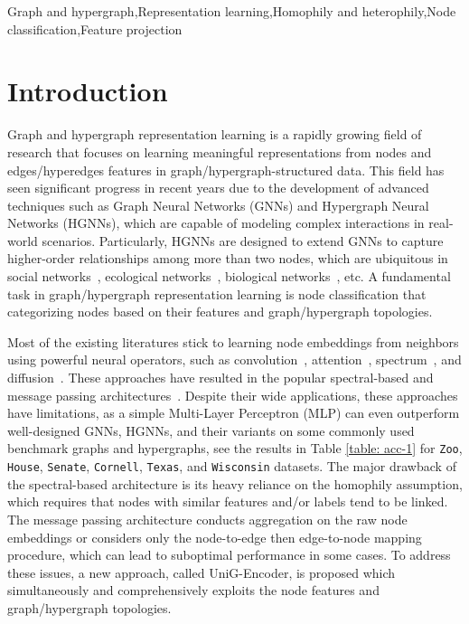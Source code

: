 \documentclass[review]{elsarticle}
\begin{document}
\begin{frontmatter}
\begin{keyword}
Graph and hypergraph\sep Representation learning\sep Homophily and heterophily\sep Node classification\sep Feature projection
\end{keyword}

\end{frontmatter}



\section{Introduction}
Graph and hypergraph representation learning is a rapidly growing field of research that focuses on learning meaningful representations from nodes and edges/hyperedges features in graph/hypergraph-structured data. This field has seen significant progress in recent years due to the development of advanced techniques such as Graph Neural Networks (GNNs) and Hypergraph Neural Networks (HGNNs), which are capable of modeling complex interactions in real-world scenarios. Particularly, HGNNs are designed to extend GNNs to capture higher-order relationships among more than two nodes, which are ubiquitous in social networks~\cite{patania2017shape,qiu2023closed}, ecological networks~\cite{bairey2016high}, biological networks~\cite{petri2014homological}, etc. A fundamental task in graph/hypergraph representation learning is node classification that categorizing nodes based on their features and graph/hypergraph topologies.

Most of the existing literatures stick to learning node embeddings from neighbors using powerful neural operators, such as convolution~\cite{kipf2016semi, ma2019graph, yadati2019hypergcn}, attention~\cite{velickovic2017graph, georgiev2022heat,zou2023similarity}, spectrum~\cite{zien1999multilevel, sun2008hypergraph}, and diffusion~\cite{wang2022equivariant}. These approaches have resulted in the popular spectral-based and message passing architectures~\cite{huang2021unignn, feng2019hypergraph, gao2022hgnn, chien2021you}. Despite their wide applications, these approaches have limitations, as a simple Multi-Layer Perceptron (MLP) can even outperform well-designed GNNs, HGNNs, and their variants on some commonly used benchmark graphs and hypergraphs, see the results in Table \ref{table: acc-1} for \texttt{Zoo}, \texttt{House}, \texttt{Senate}, \texttt{Cornell}, \texttt{Texas}, and \texttt{Wisconsin} datasets. The major drawback of the spectral-based architecture is its heavy reliance on the homophily assumption, which requires that nodes with similar features and/or labels tend to be linked. The message passing architecture conducts aggregation on the raw node embeddings or considers only the node-to-edge then edge-to-node mapping procedure, which can lead to suboptimal performance in some cases. To address these issues, a new approach, called UniG-Encoder, is proposed which simultaneously and comprehensively exploits the node features and graph/hypergraph topologies.
\end{document}

